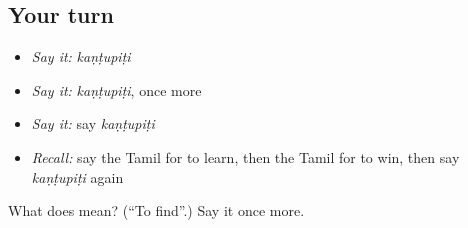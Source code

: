 \subsection*{Your turn}
\begin{itemize}
\raggedright
  \item \emph{Say it:} \emph{kaṇṭupiṭi}
  \item \emph{Say it:} \emph{kaṇṭupiṭi}, once more
  \item \emph{Say it:} say \emph{kaṇṭupiṭi}
  \item \emph{Recall:} say the Tamil for to learn, then the Tamil for to win, then say \emph{kaṇṭupiṭi} again
\end{itemize}

\begin{tcolorbox}[breakable,colback=teal!4,colframe=teal!35!black,title={Before you move on}]
What does  mean? (\textquotedblleft{}To find\textquotedblright{}.) Say it once more.
\end{tcolorbox}
